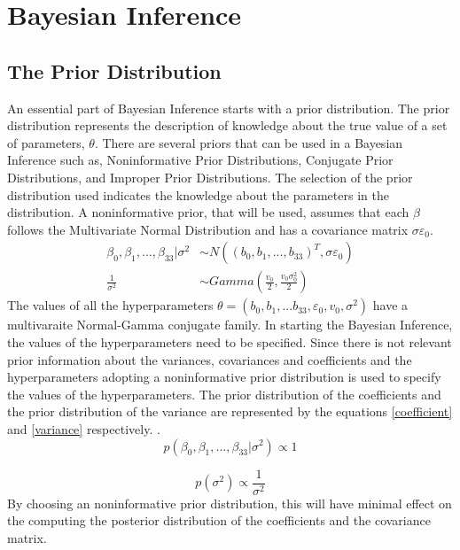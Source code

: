 \documentclass[12pt]{article}
\numberwithin{equation}{section}
\begin{document}
\section{Bayesian Inference}
\subsection{The Prior Distribution}
An essential part of Bayesian Inference starts with a prior distribution. The prior distribution represents the description of knowledge  about the true value of a set of parameters, $\theta$. There are several priors that can be used in a Bayesian Inference such as, Noninformative Prior Distributions, Conjugate Prior Distributions, and Improper Prior Distributions. The selection of the prior distribution used indicates the knowledge about the parameters in the distribution. A noninformative prior, that will be used, assumes that each $\beta$ follows the Multivariate Normal Distribution and has a covariance matrix $\sigma \varepsilon_0$. 
\begin{align}
\beta_0,\beta_1,...,\beta_{33} | \sigma^2 & \sim N((b_0,b_1,...,b_{33})^T,\sigma \varepsilon_0)\\
\frac{1}{\sigma^2} &\sim Gamma(\frac{v_0}{2},\frac{v_0\sigma_0^2}{2})
\end{align}
The values of all the hyperparameters $\theta = (b_0,b_1,...b_{33},\varepsilon_0,v_0,\sigma^2)$ have a multivaraite Normal-Gamma conjugate family. In starting the Bayesian Inference, the values of the hyperparameters need to be specified. Since there is not relevant prior information about the variances, covariances and coefficients and the hyperparameters adopting a noninformative prior distribution is used to specify the values of the hyperparameters. 
The prior distribution of the coefficients and the prior distribution of the variance are represented by the equations \eqref{coefficient} and \eqref{variance} respectively. . 
\begin{equation}\label{coefficient}
p(\beta_0,\beta_1,...,\beta_{33} |\sigma^2) \propto 1
\end{equation} 

\begin{equation}\label{variance}
p(\sigma^2)\propto \frac{1}{\sigma^2}
\end{equation}
By choosing an noninformative prior distribution, this will have minimal effect on the computing the posterior distribution of the coefficients and the covariance matrix. 
\end{document}
